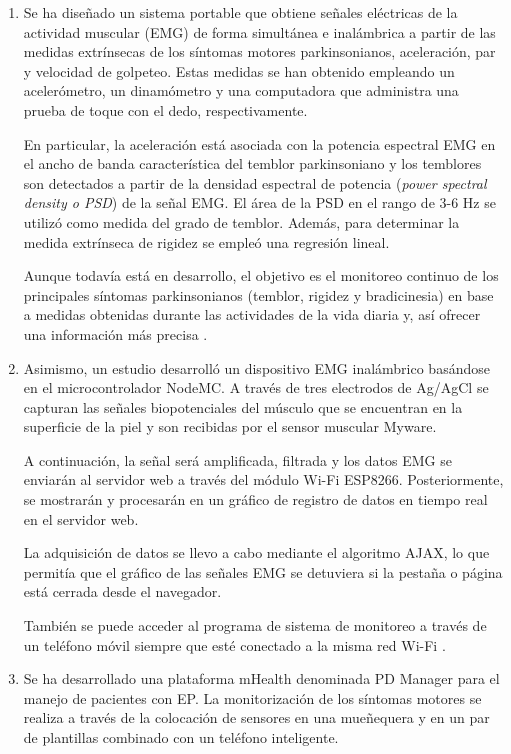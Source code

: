 \begin{enumerate}
    \item Se ha diseñado un sistema portable que obtiene señales eléctricas de la actividad muscular (EMG) de forma simultánea e inalámbrica a partir de las medidas extrínsecas de los síntomas motores parkinsonianos, aceleración, par y velocidad de golpeteo.  Estas medidas se han obtenido empleando un acelerómetro, un dinamómetro y una computadora que administra una prueba de toque con el dedo, respectivamente. 

    En particular, la aceleración está asociada con la potencia espectral EMG en el ancho de banda característica del temblor parkinsoniano y los temblores son detectados a partir de la densidad espectral de potencia (\textit{power spectral density o PSD}) de la señal EMG. El área de la PSD en el rango de 3-6 Hz se utilizó como medida del grado de temblor. Además, para determinar la medida extrínseca de rigidez se empleó una regresión lineal.
    
    Aunque todavía está en desarrollo, el objetivo es el monitoreo continuo de los principales síntomas parkinsonianos (temblor, rigidez y bradicinesia) en base a medidas obtenidas durante las actividades de la vida diaria y, así ofrecer una información más precisa \cite{askari2010emg}.
    
    \item Asimismo, un estudio desarrolló un dispositivo EMG inalámbrico basándose en el microcontrolador NodeMC. A través de tres electrodos de Ag/AgCl se capturan las señales biopotenciales del músculo que se encuentran en la superficie de la piel y son recibidas por el sensor muscular Myware.
    
    A continuación, la señal será amplificada, filtrada y los datos EMG se enviarán al servidor web a través del módulo Wi-Fi ESP8266. Posteriormente, se mostrarán y procesarán en un gráfico de registro de datos en tiempo real en el servidor web. 
    
    La adquisición de datos se llevo a cabo mediante el algoritmo AJAX, lo que permitía que el gráfico de las señales EMG se detuviera si la pestaña o página está cerrada desde el navegador.
    
    También se puede acceder al programa de sistema de monitoreo a través de un teléfono móvil siempre que esté conectado a la misma red Wi-Fi \cite{fadhlannisa2020design}. 
    
    \item Se ha desarrollado una plataforma mHealth denominada PD Manager para el manejo de pacientes con EP. La monitorización de los síntomas motores se realiza a través de la colocación de sensores en una mueñequera y en un par de plantillas combinado con un teléfono inteligente. 
    

\end{enumerate}
